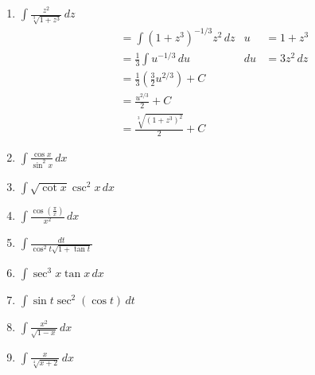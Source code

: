\documentclass[12pt]{article}
\newcommand{\mins}{-}
\newcommand{\inline}[1]{\({#1}\)}
\begin{document}
\begin{enumerate}
        \item \inline{\int{} \frac{z^2}{\sqrt[3]{1 + z^3}} \, dz}
        \begin{align*}
            &= \int{} {(1 + z^3)}^{-1/3} z^2 \, dz                           & u &= 1 + z^3 \\
            &= \frac{1}{3} \int{} u^{-1/3} \, du                             & du &= 3z^2 \, dz \\
            &= \frac{1}{3} \left(\frac{3}{2} u^{2/3}\right) + C \\
            &= \frac{u^{2/3}}{2} + C \\
            &= \frac{\sqrt[3]{{(1 + z^3)}^2}}{2} + C
        \end{align*}

        \item \inline{\int{} \frac{\cos{x}}{\sin^2{x}} \, dx}
        \item \inline{\int{} \sqrt{\cot{x}} \csc^2{x} \, dx}
        \item \inline{\int{} \frac{\cos{(\frac{\pi{}}{x})}}{x^2} \, dx}
        \item \inline{\int{} \frac{dt}{\cos^2{t} \sqrt{1 + \tan{t}}}}
        \item \inline{\int{} \sec^3{x} \tan{x} \, dx}
        \item \inline{\int{} \sin{t} \sec^2{(\cos{t})} \, dt}
        \item \inline{\int{} \frac{x^2}{\sqrt{1 \mins{} x}} \, dx}
        \item \inline{\int{} \frac{x}{\sqrt[4]{x + 2}} \, dx}
    \end{enumerate}
\end{document}

